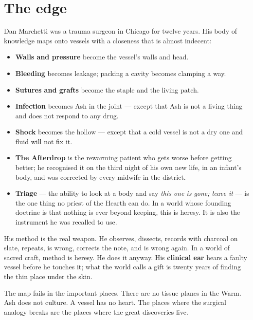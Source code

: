 \documentclass{design/chronicle}
\begin{document}
\section*{The edge}

Dan Marchetti was a trauma surgeon in Chicago for twelve years. His body of knowledge maps onto vessels with a closeness that is almost indecent:

\begin{itemize}[leftmargin=1.4em,itemsep=1pt,topsep=3pt,parsep=0pt]

\item \textbf{Walls and pressure} become the vessel’s walls and head.

\item \textbf{Bleeding} becomes leakage; packing a cavity becomes clamping a way.

\item \textbf{Sutures and grafts} become the staple and the living patch.

\item \textbf{Infection} becomes Ash in the joint — except that Ash is not a living thing and does not respond to any drug.

\item \textbf{Shock} becomes the hollow — except that a cold vessel is not a dry one and fluid will not fix it.

\item \textbf{The Afterdrop} is the rewarming patient who gets worse before getting better; he recognised it on the third night of his own new life, in an infant’s body, and was corrected by every midwife in the district.

\item \textbf{Triage} — the ability to look at a body and say \emph{this one is gone; leave it} — is the one thing no priest of the Hearth can do. In a world whose founding doctrine is that nothing is ever beyond keeping, this is heresy. It is also the instrument he was recalled to use.

\end{itemize}

His method is the real weapon. He observes, dissects, records with charcoal on slate, repeats, is wrong, corrects the note, and is wrong again. In a world of sacred craft, method is heresy. He does it anyway. His \textbf{clinical ear} hears a faulty vessel before he touches it; what the world calls a gift is twenty years of finding the thin place under the skin.

The map fails in the important places. There are no tissue planes in the Warm. Ash does not culture. A vessel has no heart. The places where the surgical analogy breaks are the places where the great discoveries live.
\end{document}
